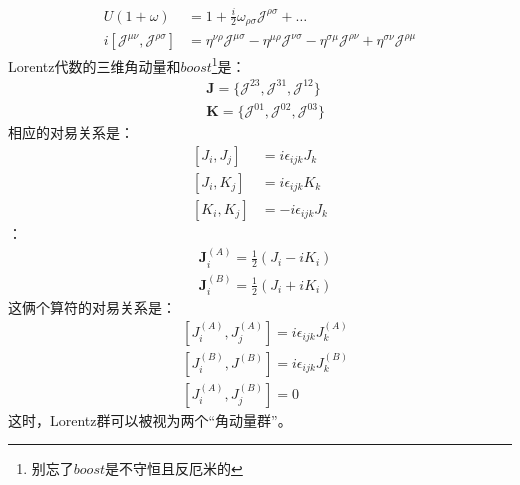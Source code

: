 \begin{subequations}
    \begin{align}
        U(1+\omega)&={1}+\frac{i}{2}\omega_{\rho\sigma}\mathscr{J}^{\rho\sigma}+\dots\\
         i\left[\mathscr{J}^{\mu\nu},\mathscr{J}^{\rho\sigma} \right]
         &=
        \eta^{\nu\rho}\mathscr{J}^{\mu\sigma}
        -\eta^{\mu\rho}\mathscr{J}^{\nu\sigma}
        -\eta^{\sigma\mu}\mathscr{J}^{\rho\nu}
        +\eta^{\sigma\nu}\mathscr{J}^{\rho\mu}
    \end{align}
\end{subequations}
Lorentz代数的三维角动量和$boost$\footnote{别忘了$boost$是不守恒且反厄米的}是：
\begin{subequations}
    \begin{align}
        &\boldsymbol{J} = \{\mathscr{J}^{23}, \mathscr{J}^{31}, \mathscr{J}^{12}\}\\
        &\boldsymbol{K} = \{\mathscr{J}^{01}, \mathscr{J}^{02}, \mathscr{J}^{03}\}
    \end{align}
\end{subequations}
相应的对易关系是：
\begin{subequations}
    \begin{align}
        [J_{i}, J_{j}] &= i\epsilon_{ijk} J_{k}  \\
        [J_{i}, K_{j}] &= i\epsilon_{ijk} K_{k} \\
        [K_{i}, K_{j}] &= -i\epsilon_{ijk} J_{k} 
    \end{align}
\end{subequations}
：
\begin{subequations}\label{su2+su2}
    \begin{align}
        &\boldsymbol{J}^{(A)}_i=\frac{1}{2}(J_i-iK_i)\\
        &\boldsymbol{J}^{(B)}_i=\frac{1}{2}(J_i+iK_i)
    \end{align}
\end{subequations}
这俩个算符的对易关系是：
\begin{subequations}
    \begin{align}
        &[J^{(A)}_i,J^{(A)}_j]=i\epsilon_{ijk} J^{(A)}_{k}\\
        &[J^{(B)}_i,J^{(B)}]=i\epsilon_{ijk} J^{(B)}_{k}\\
        &[J^{(A)}_i,J^{(B)}_j]=0
    \end{align}
\end{subequations}
这时，\color{blue}Lorentz群可以被视为两个“角动量群”。
